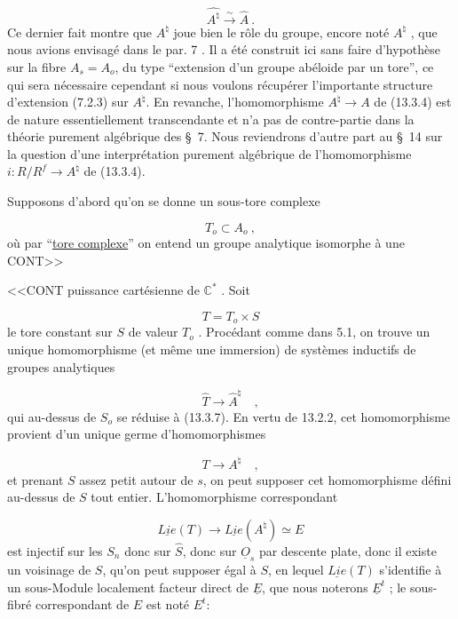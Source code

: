 \begin{equation}\tag{13.3.6}
\widehat{A^\natural} \stackrel{\sim}{\longrightarrow} \hat{A} \ .
\end{equation}
Ce dernier fait montre que $A^\natural$ joue bien le rôle du groupe, encore noté $A^\natural$ , que nous avions envisagé dans le par. 7 . Il a été construit ici sans faire d'hypothèse sur la fibre $A_s = A_o$, du type ``extension d'un groupe abéloide par un tore'', ce qui sera nécessaire cependant si nous voulons récupérer l'importante structure d'extension (7.2.3) sur $A^\natural$. En revanche, l'homomorphisme $A^\natural \longrightarrow A$ de (13.3.4) est de nature essentiellement transcendante et n'a pas de contre-partie dans la théorie purement algébrique des \S~7. Nous reviendrons d'autre part au \S~14 sur la question d'une interprétation purement algébrique de l'homomorphisme $i : R/R^f \longrightarrow A^\natural$ de (13.3.4).

Supposons d'abord qu'on se donne un sous-tore complexe

\begin{equation}\tag{13.3.7}
T_o \subset A_o \ ,
\end{equation}
où par ``\underline{tore complexe}'' on entend un groupe analytique isomorphe à une CONT>>



<<CONT puissance cartésienne de $\mathbb{C}^*$ . Soit

\begin{equation}\tag{13.3.8}
T = T_o \times S
\end{equation}
le tore constant sur $S$ de valeur $T_o$ . Procédant comme dans 5.1, on trouve un unique homomorphisme (et même une immersion) de systèmes inductifs de groupes analytiques

\begin{equation*}
\hat{T} \longrightarrow \hat{A}^{\natural} \quad ,
\end{equation*}
qui au-dessus de $S_o$ se réduise à (13.3.7). En vertu de 13.2.2, cet homomorphisme provient d'un unique germe d'homomorphismes

\begin{equation}\tag{13.3.9}
T \longrightarrow A^{\natural} \quad ,
\end{equation}
et prenant $S$ assez petit autour de $s$, on peut supposer cet homomorphisme défini au-dessus de $S$ tout entier. L'homomorphisme correspondant

\begin{equation*}
\underline{Lie}(T) \longrightarrow \underline{Lie}(A^{\natural}) \simeq E
\end{equation*}
est injectif sur les $S_n$ donc sur $\hat{S}$, donc sur $\underline{O}_s$ par descente plate, donc il existe un voisinage de $S$, qu'on peut supposer égal à $S$, en lequel $\underline{Lie}(T)$ s'identifie à un sous-Module localement facteur direct de $\underline{E}$, que nous noterons $\underline{E}^t$ ; le sous-fibré correspondant de $E$ est noté $E^t$:

